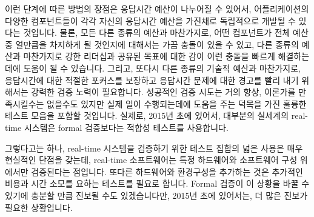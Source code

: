 이런 단계에 따른 방법의 장점은 응답시간 예산이 나누어질 수 있어서,
어플리케이션의 다양한 컴포넌트들이 각각 자신의 응답시간 예산을 가진채로
독립적으로 개발될 수 있다는 것입니다.
물론, 모든 다른 종류의 예산과 마찬가지로, 어떤 컴포넌트가 전체 예산 중 얼만큼을
차지하게 될 것인지에 대해서는 가끔 충돌이 있을 수 있고, 다른 종류의 예산과
마찬가지로 강한 리더십과 공유된 목표에 대한 감이 이런 충돌을 빠르게
해결하는데에 도움이 될 수 있습니다.
그리고, 또다시 다른 종류의 기술적 예산과 마찬가지로, 응답시간에 대한 적절한
포커스를 보장하고 응답시간 문제에 대한 경고를 빨리 내기 위해서는 강력한 검증
노력이 필요합니다.
성공적인 검증 시도는 거의 항상, 이론가를 만족시킬수는 없을수도 있지만 실제 일이
수행되는데에 도움을 주는 덕목을 가진 훌륭한 테스트 모음을 포함할 것입니다.
실제로, 2015년 초에 있어서, 대부분의 실세계의 real-time 시스템은 formal
검증보다는 적합성 테스트를 사용합니다.

그렇다고는 하나, real-time 시스템을 검증하기 위한 테스트 집합의 넓은 사용은
매우 현실적인 단점을 갖는데, real-time 소프트웨어는 특정 하드웨어와 소프트웨어
구성 위에서만 검증된다는 점입니다.
또다른 하드웨어와 환경구성을 추가하는 것은 추가적인 비용과 시간 소모를 요하는
테스트를 필요로 합니다.
Formal 검증이 이 상황을 바꿀 수 있기에 충분할 만큼 진보될 수도 있겠습니다만,
2015년 초에 있어서는, 더 많은 진보가 필요한 상황입니다.

